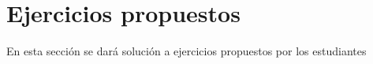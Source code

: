 












\section{Ejercicios propuestos}

En esta sección se dará solución a ejercicios propuestos por los estudiantes
















